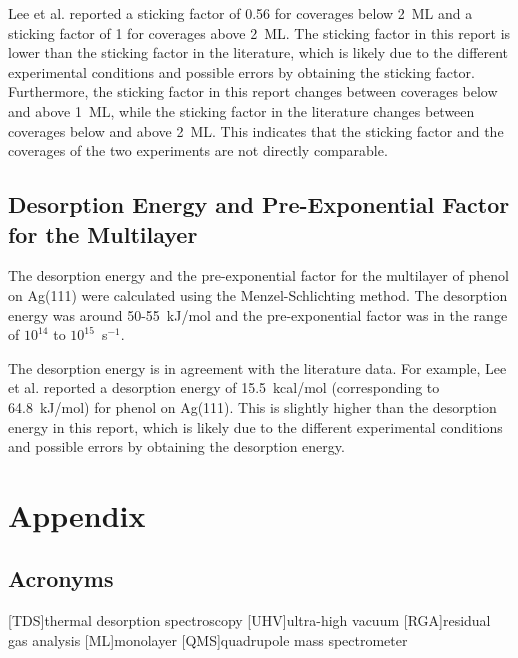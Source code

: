 \documentclass[fontsize=11pt,reqno,a4paper,oneside]{scrartcl}
\begin{document}
Lee et al.\autocite{Lee2001} reported a sticking factor of 0.56 for coverages below 2~ML and a sticking factor of 1 for coverages above 2~ML. The sticking factor in this report is lower than the sticking factor in the literature, which is likely due to the different experimental conditions and possible errors by obtaining the sticking factor. Furthermore, the sticking factor in this report changes between coverages below and above 1~ML, while the sticking factor in the literature changes between coverages below and above 2~ML. This indicates that the sticking factor and the coverages of the two experiments are not directly comparable.


\subsection{Desorption Energy and Pre-Exponential Factor for the Multilayer}

The desorption energy and the pre-exponential factor for the multilayer of phenol on Ag(111) were calculated using the Menzel-Schlichting method.\autocite{Schlichting1992} The desorption energy was around 50-55~kJ/mol and the pre-exponential factor was in the range of $10^{14}$ to $10^{15}$~s$^{-1}$.

The desorption energy is in agreement with the literature data. For example, Lee et al.\autocite{Lee2001} reported a desorption energy of 15.5~kcal/mol (corresponding to 64.8~kJ/mol) for phenol on Ag(111). This is slightly higher than the desorption energy in this report, which is likely due to the different experimental conditions and possible errors by obtaining the desorption energy.

\clearpage
\section{Appendix}

\subsection*{Acronyms}

\begin{acronym}
    [TDS]{thermal desorption spectroscopy}
    [UHV]{ultra-high vacuum}
    [RGA]{residual gas analysis}
    [ML]{monolayer}
    [QMS]{quadrupole mass spectrometer}
\end{acronym}

\printbibliography[heading=bibintoc, title={References}] 
\end{document}
